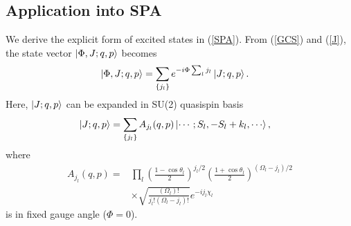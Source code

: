 \documentclass[%
superscriptaddress,
showpacs,
nofootinbib,
amsmath,amssymb,
aps,
prc,
twocolumn,
floatfix ]%
{revtex4-1}
\begin{document}
\subsection{Application into SPA}
We derive the explicit form of excited states in (\ref{SPA}). From (\ref{GCS}) and (\ref{J}), the state vector $\ket{\Phi,J;q,p}$ becomes
\begin{align}
  \ket{\Phi,J;q,p} &= \sum_{\{j_l\}} e^{-i\Phi \sum_l j_l} \ket{J;q,p} .
\end{align}
Here, $\ket{J;q,p}$ can be expanded in SU(2) quasispin basis
\begin{align}
  \ket{J;q,p} &= \sum_{\{j_l\}} A_{j_l}(q,p) \ket{\cdots;S_l,-S_l+k_l,\cdots}, 
\end{align}
where 
\begin{align}
  A_{j_l}(q,p) =& \prod_l \left(\frac{1-\cos{\theta}_l}{2}\right)^{j_l/2}\left(\frac{1+\cos{\theta}_l}{2}\right)^{(\Omega_l-j_l)/2}
  \nonumber \\
  &\times\sqrt{\frac{(\Omega_l)!}{j_l!(\Omega_l-j_l)!}} e^{-ij_l\chi_l} 
\end{align}
is in fixed gauge angle ($\Phi=0$).
\end{document}
